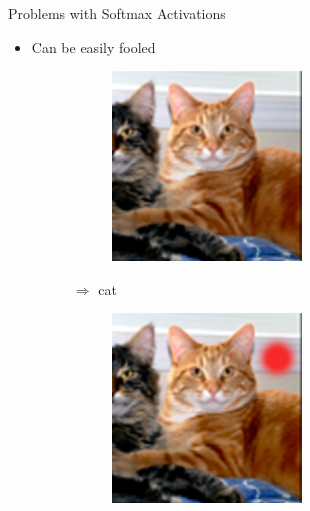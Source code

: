 \documentclass[xcolor={usenames,dvipsnames}]{beamer}
\begin{document}
\begin{frame}{Problems with Softmax Activations}
	
	\begin{itemize}
		\item Can be easily fooled
		\begin{figure}[H]
			\centering
			\begin{subfigure}{.1\textwidth}
				\includegraphics[width=\textwidth]{cat} 
			\end{subfigure} $\Rightarrow$ cat\hspace{.5cm}
			\begin{subfigure}{.1\textwidth}
				\includegraphics[width=\textwidth]{cat_fooled}

\end{subfigure}
\end{figure}
\end{itemize}
\end{frame}
\end{document}
